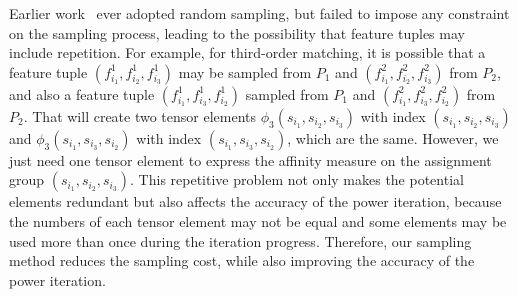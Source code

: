 Earlier work~\cite{Duchenne_etal09,Zass08} ever adopted random sampling, 
but failed to impose any constraint on the sampling process,
leading to the possibility that feature tuples may include repetition.
For example, for third-order matching, it is possible that a feature tuple $(f_{i_1}^1, f_{i_2}^1, f_{i_3}^1)$ may be sampled from $P_1$ and $(f_{i_1}^2, f_{i_2}^2, f_{i_3}^2)$ from $P_2$, and also a feature tuple $(f_{i_1}^1, f_{i_3}^1, f_{i_2}^1)$ sampled from $P_1$ and $(f_{i_1}^2, f_{i_3}^2, f_{i_2}^2)$ from $P_2$. That will create two tensor elements $\phi_3(s_{i_1}, s_{i_2}, s_{i_3})$ with index $(s_{i_1}, s_{i_2}, s_{i_3})$ and $\phi_3(s_{i_1}, s_{i_3}, s_{i_2})$ with index $(s_{i_1}, s_{i_3}, s_{i_2})$, which are the same. However, we just need one tensor element to express the affinity measure on the assignment group $(s_{i_1}, s_{i_2}, s_{i_3})$. 
This repetitive problem not only makes the potential elements redundant but also affects the accuracy of the power iteration, 
because the numbers of each tensor element may not be equal and some elements may be used more than once during the iteration progress.
Therefore, our sampling method reduces the sampling cost, while also improving the accuracy of the power iteration.
